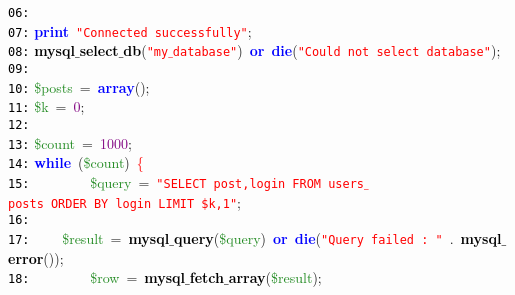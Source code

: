 \documentclass[a4paper,12pt]{article}
\begin{document}
\mbox{}\texttt{\textcolor{Black}{06:}}  \\
\mbox{}\texttt{\textcolor{Black}{07:}} \textbf{\textcolor{Blue}{print}}\ \texttt{\textcolor{Red}{"{}Connected\ successfully"{}}}\textcolor{BrickRed}{;} \\
\mbox{}\texttt{\textcolor{Black}{08:}} \textbf{\textcolor{Black}{mysql$\_$select$\_$db}}\textcolor{BrickRed}{(}\texttt{\textcolor{Red}{"{}my$\_$database"{}}}\textcolor{BrickRed}{)}\ \textbf{\textcolor{Blue}{or}}\ \textbf{\textcolor{Blue}{die}}\textcolor{BrickRed}{(}\texttt{\textcolor{Red}{"{}Could\ not\ select\ database"{}}}\textcolor{BrickRed}{);} \\
\mbox{}\texttt{\textcolor{Black}{09:}}  \\
\mbox{}\texttt{\textcolor{Black}{10:}} \textcolor{ForestGreen}{\$posts}\ \textcolor{BrickRed}{=}\ \textbf{\textcolor{Blue}{array}}\textcolor{BrickRed}{();} \\
\mbox{}\texttt{\textcolor{Black}{11:}} \textcolor{ForestGreen}{\$k}\ \textcolor{BrickRed}{=}\ \textcolor{Purple}{0}\textcolor{BrickRed}{;} \\
\mbox{}\texttt{\textcolor{Black}{12:}}  \\
\mbox{}\texttt{\textcolor{Black}{13:}} \textcolor{ForestGreen}{\$count}\ \textcolor{BrickRed}{=}\ \textcolor{Purple}{1000}\textcolor{BrickRed}{;} \\
\mbox{}\texttt{\textcolor{Black}{14:}} \textbf{\textcolor{Blue}{while}}\ \textcolor{BrickRed}{(}\textcolor{ForestGreen}{\$count}\textcolor{BrickRed}{)}\ \textcolor{Red}{\{} \\
\mbox{}\texttt{\textcolor{Black}{15:}} \ \ \ \ \ \ \ \ \textcolor{ForestGreen}{\$query}\ \textcolor{BrickRed}{=}\ \texttt{\textcolor{Red}{"{}SELECT\ post,login\ FROM\ users$\_$posts\ ORDER\ BY\ login\ LIMIT\ \$k,1"{}}}\textcolor{BrickRed}{;} \\
\mbox{}\texttt{\textcolor{Black}{16:}}  \\
\mbox{}\texttt{\textcolor{Black}{17:}} \ \ \ \ \textcolor{ForestGreen}{\$result}\ \textcolor{BrickRed}{=}\ \textbf{\textcolor{Black}{mysql$\_$query}}\textcolor{BrickRed}{(}\textcolor{ForestGreen}{\$query}\textcolor{BrickRed}{)}\ \textbf{\textcolor{Blue}{or}}\ \textbf{\textcolor{Blue}{die}}\textcolor{BrickRed}{(}\texttt{\textcolor{Red}{"{}Query\ failed\ :\ "{}}}\ \textcolor{BrickRed}{.}\ \textbf{\textcolor{Black}{mysql$\_$error}}\textcolor{BrickRed}{());} \\
\mbox{}\texttt{\textcolor{Black}{18:}} \ \ \ \ \ \ \ \ \textcolor{ForestGreen}{\$row}\ \textcolor{BrickRed}{=}\ \textbf{\textcolor{Black}{mysql$\_$fetch$\_$array}}\textcolor{BrickRed}{(}\textcolor{ForestGreen}{\$result}\textcolor{BrickRed}{);} \\
\end{document}
